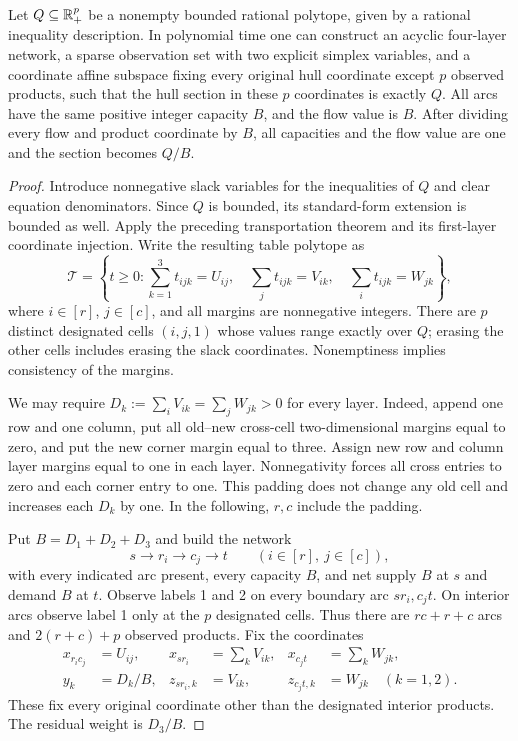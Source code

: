 \begin{theorem}\label{thm:universality}
Let $Q\subseteq\mathbb R_+^p$ be a nonempty bounded rational polytope, given by a
rational inequality description. In polynomial time one can construct an
acyclic four-layer network, a sparse observation set with two explicit
simplex variables, and a coordinate affine subspace fixing every original hull
coordinate except $p$ observed products, such that the hull section in
these $p$ coordinates is exactly $Q$. All arcs have the same positive
integer capacity $B$, and the flow value is $B$.
After dividing every flow and product coordinate by $B$, all capacities
and the flow value are one and the section becomes $Q/B$.
\end{theorem}
\begin{proof}
Introduce nonnegative slack variables for the inequalities of $Q$ and
clear equation denominators. Since $Q$ is bounded, its standard-form
extension is bounded as well. Apply the preceding transportation theorem
and its first-layer coordinate injection. Write the resulting table
polytope as
\begin{equation}\label{eq:universal-table}
 \mathcal T=\left\{t\ge0:
 \sum_{k=1}^3t_{ijk}=U_{ij},\quad
 \sum_jt_{ijk}=V_{ik},\quad
 \sum_it_{ijk}=W_{jk}\right\},
\end{equation}
where $i\in[r]$, $j\in[c]$, and all margins are nonnegative integers.
There are $p$ distinct designated cells $(i,j,1)$ whose values range
exactly over $Q$; erasing the other cells includes erasing the slack
coordinates. Nonemptiness implies consistency of the margins.

We may require $D_k:=\sum_iV_{ik}=\sum_jW_{jk}>0$ for every layer.
Indeed, append one row and one column, put all old--new cross-cell
two-dimensional margins equal to zero, and put the new corner margin
equal to three. Assign new row and column layer margins equal to one
in each layer. Nonnegativity forces all cross entries to zero and each
corner entry to one. This padding does not change any old cell and
increases each $D_k$ by one. In the following, $r,c$ include the padding.

Put $B=D_1+D_2+D_3$ and build the network
\[
 s\longrightarrow r_i\longrightarrow c_j\longrightarrow t
 \qquad(i\in[r],\ j\in[c]),
\]
with every indicated arc present, every capacity $B$, and net supply
$B$ at $s$ and demand $B$ at $t$. Observe labels 1 and 2 on every
boundary arc $sr_i,c_jt$. On interior arcs observe label 1 only at
the $p$ designated cells. Thus there are $rc+r+c$ arcs and
$2(r+c)+p$ observed products. Fix the coordinates
\begin{align*}
 x_{r_ic_j}&=U_{ij},&
 x_{sr_i}&=\sum_kV_{ik},&x_{c_jt}&=\sum_kW_{jk},\\
 y_k&=D_k/B,&
 z_{sr_i,k}&=V_{ik},&z_{c_jt,k}&=W_{jk}\quad(k=1,2).
\end{align*}
These fix every original coordinate other than the designated interior
products. The residual weight is $D_3/B$.


\end{proof}
